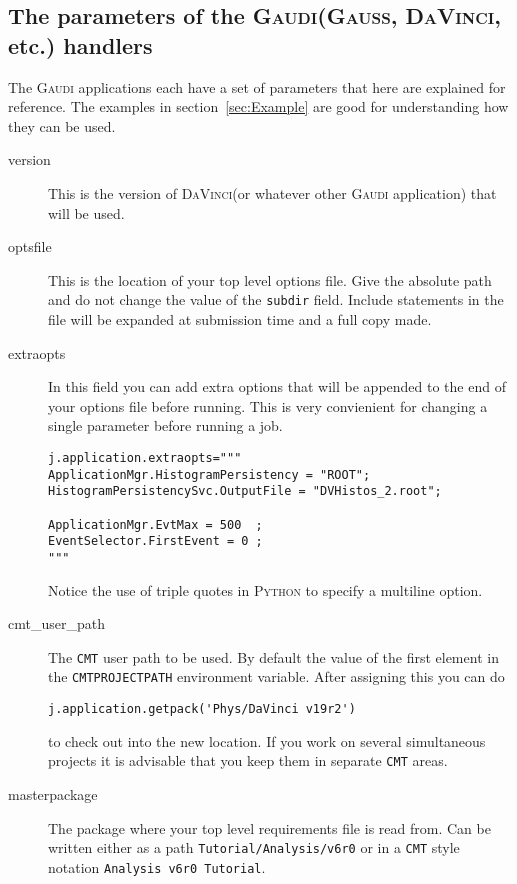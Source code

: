 \documentclass{howto}
\def\python {\textsc{Python}\xspace}
\def\gaudi {\textsc{Gaudi}\xspace}
\def\davinci {\textsc{DaVinci}\xspace}
\def\gauss {\textsc{Gauss}\xspace}
\begin{document}
\subsection{The parameters of the \gaudi (\gauss, \davinci, etc.) handlers}
\label{sec:GaudiParameters}
The \gaudi applications each have a set of parameters that here are explained
for reference. The examples in section~\ref{sec:Example} are good for
understanding how they can be used.
\begin{description}
\item[version] This is the version of \davinci (or whatever other \gaudi
  application) that will be used.
\item[optsfile] This is the location of your top level options file. Give the
  absolute path and do not change the value of the \texttt{subdir} field.
  Include statements in the file will be expanded at submission time and a
  full copy made.
\item[extraopts] In this field you can add extra options that will be appended
  to the end of your options file before running. This is very convienient for
  changing a single parameter before running a job.
\begin{verbatim}
j.application.extraopts="""
ApplicationMgr.HistogramPersistency = "ROOT";
HistogramPersistencySvc.OutputFile = "DVHistos_2.root";

ApplicationMgr.EvtMax = 500  ;
EventSelector.FirstEvent = 0 ;
"""
\end{verbatim}
  Notice the use of triple quotes in \python to specify a multiline option.
\item[cmt_user_path] The \texttt{CMT} user path to be used. By default the
  value of the first element in the \texttt{CMTPROJECTPATH} environment
  variable.  After assigning this you can do 
\begin{verbatim}
j.application.getpack('Phys/DaVinci v19r2') 
\end{verbatim}
  to check out into the new location. If you work on several simultaneous
  projects it is advisable that you keep them in separate \texttt{CMT} areas.
\item[masterpackage] The package where your top level requirements file is
  read from. Can be written either as a path \texttt{Tutorial/Analysis/v6r0}
  or in a \texttt{CMT} style notation \texttt{Analysis v6r0 Tutorial}.
\end{description}
\end{document}
